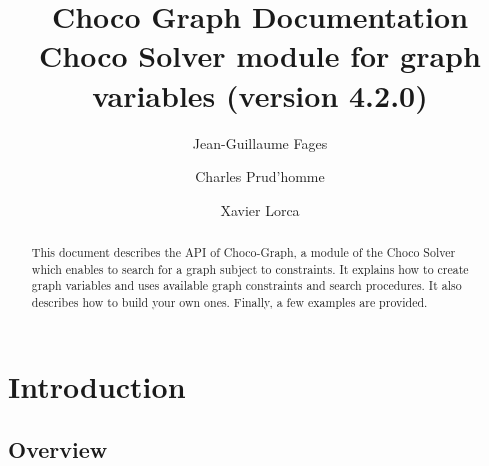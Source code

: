 \documentclass{article}
\begin{document}
\author[1]{Jean-Guillaume Fages}
\author[2]{Charles Prud'homme}
\author[2]{Xavier Lorca}
\title{Choco Graph Documentation \\ \large{Choco Solver module for graph variables (version 4.2.0)}}
\maketitle

\begin{abstract}
This document describes the API  of Choco-Graph, a module of the Choco Solver which enables to search for a graph subject to constraints. 
It explains how to create graph variables and uses available graph constraints and search procedures. It also describes how to build your own ones. Finally, a few examples are provided.
\end{abstract}

\newpage{}
{\scriptsize\tableofcontents{}}
\newpage{}

\newcommand{\GV}{\ensuremath{\mathcal{G}}}
\newcommand{\GLB}{\ensuremath{\underline{\mathcal{G}}}}
\newcommand{\GUB}{\ensuremath{\overline{\mathcal{G}}}}


\section{Introduction}

\subsection{Overview}
\end{document}
